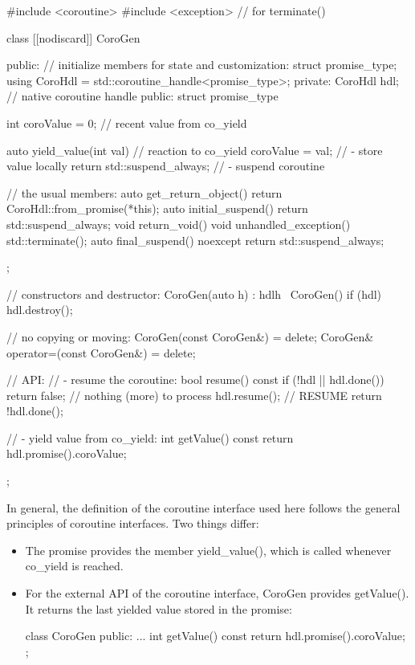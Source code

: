 \begin{cpp}
#include <coroutine>
#include <exception> // for terminate()

class [[nodiscard]] CoroGen {
public:
	// initialize members for state and customization:
	struct promise_type;
	using CoroHdl = std::coroutine_handle<promise_type>;
private:
	CoroHdl hdl; // native coroutine handle
public:
	struct promise_type {
		int coroValue = 0; // recent value from co_yield
		
		auto yield_value(int val) { // reaction to co_yield
			coroValue = val; // - store value locally
			return std::suspend_always{}; // - suspend coroutine
		}
		
		// the usual members:
		auto get_return_object() { return CoroHdl::from_promise(*this); }
		auto initial_suspend() { return std::suspend_always{}; }
		void return_void() { }
		void unhandled_exception() { std::terminate(); }
		auto final_suspend() noexcept { return std::suspend_always{}; }
	};
	
	// constructors and destructor:
	CoroGen(auto h) : hdl{h} { }
	~CoroGen() { if (hdl) hdl.destroy(); }
	
	// no copying or moving:
	CoroGen(const CoroGen&) = delete;
	CoroGen& operator=(const CoroGen&) = delete;
	
	// API:
	// - resume the coroutine:
	bool resume() const {
		if (!hdl || hdl.done()) {
			return false; // nothing (more) to process
			}
			hdl.resume(); // RESUME
			return !hdl.done();
		}
		
	// - yield value from co_yield:
	int getValue() const {
		return hdl.promise().coroValue;
	}
};
\end{cpp}

In general, the definition of the coroutine interface used here follows the general principles of coroutine interfaces. Two things differ:

\begin{itemize}
\item 
The promise provides the member yield\_value(), which is called whenever co\_yield is reached.

\item
For the external API of the coroutine interface, CoroGen provides getValue(). It returns the last yielded value stored in the promise:

\begin{cpp}
class CoroGen {
	public:
	...
	int getValue() const {
		return hdl.promise().coroValue;
	}
};
\end{cpp}
\end{itemize}

